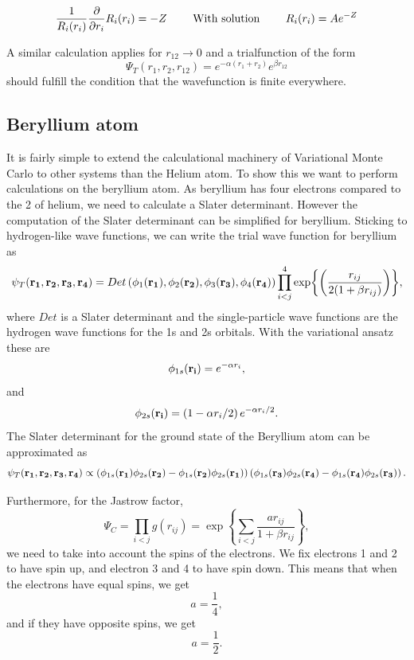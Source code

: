 \documentclass[11pt]{article}
\begin{document}
		\begin{align}
			 \frac{1}{R_i(r_i)} \pdv{}{r_i} R_i(r_i)	=  -Z  \qquad{ \text{ With solution }}  \qquad R_i(r_i) = A e^{-Z}
		\end{align}

		A similar calculation applies for \(r_{12} \rightarrow 0\) and a trialfunction of the form   \[\Psi_T(r_1,r_2,r_{12}) = e^{-\alpha (r_1 + r_2)} e^{\beta r_{12}} \] should fulfill the condition that the wavefunction is finite everywhere.


	\subsection{Beryllium atom}

		It is fairly simple to extend the calculational machinery of Variational
		Monte Carlo to other systems than the Helium atom. To show this we
		want to perform calculations on the beryllium atom. As beryllium has
		four electrons compared to the 2 of helium, we need to calculate a
		Slater determinant. However the computation of the Slater determinant
		can be simplified for beryllium. Sticking to hydrogen-like wave functions,
		we can write the trial wave function for beryllium as
		\begin{equation}
			\psi_{T}({\bf r_{1}},{\bf r_{2}},{\bf r_{3}},{\bf r_{4}})=Det\left(\phi_{1}({\bf r_{1}}),\phi_{2}({\bf r_{2}}),\phi_{3}({\bf r_{3}}),\phi_{4}({\bf r_{4}})\right)\prod_{i<j}^{4}\exp{\left(\frac{r_{ij}}{2(1+\beta r_{ij})}\right)},
		\end{equation}
		where $Det$ is a Slater determinant and the single-particle wave
		functions are the hydrogen wave functions for the 1s and 2s orbitals.
		With the variational ansatz these are
		\[
		\phi_{1s}({\bf r_{i}})=e^{-\alpha r_{i}},
		\]
		and 
		\[
		\phi_{2s}({\bf r_{i}})=\left(1-\alpha r_{i}/2\right)e^{-\alpha r_{i}/2}.
		\]
		The Slater determinant for the ground state of the Beryllium atom
		can be approximated as
		\[
		\psi_{T}({\bf r_{1}},{\bf r_{2}},{\bf r_{3}},{\bf r_{4}})\propto\left(\phi_{1s}({\bf r_{1}})\phi_{2s}({\bf r_{2}})-\phi_{1s}({\bf r_{2}})\phi_{2s}({\bf r_{1}})\right)\left(\phi_{1s}({\bf r_{3}})\phi_{2s}({\bf r_{4}})-\phi_{1s}({\bf r_{4}})\phi_{2s}({\bf r_{3}})\right).
		\]


		Furthermore, for the Jastrow factor, 
		\[
		\Psi_{C}=\prod_{i<j}g(r_{ij})=\exp{\left\{ \sum_{i<j}\frac{ar_{ij}}{1+\beta r_{ij}}\right\} },
		\]
		we need to take into account the spins of the electrons. We fix electrons
		1 and 2 to have spin up, and electron 3 and 4 to have spin down. This
		means that when the electrons have equal spins, we get
		\[
		a=\frac{1}{4},
		\]
		and if they have opposite spins, we get
		\[
		a=\frac{1}{2}.
		\]
\end{document}
